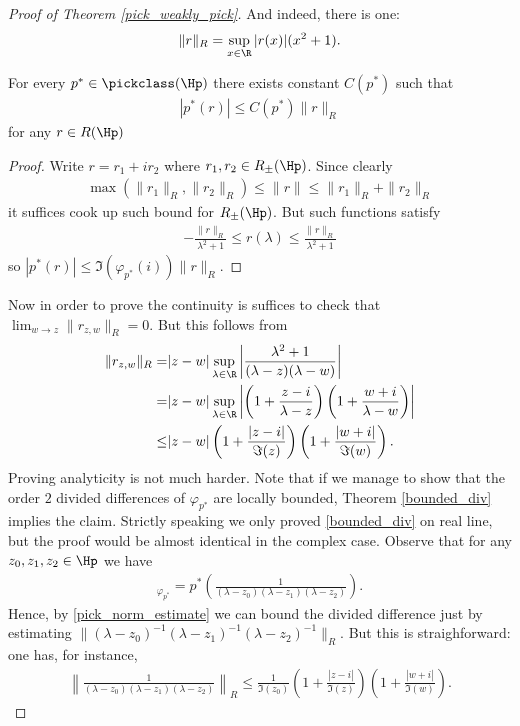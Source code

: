 \begin{proof}[Proof of Theorem \ref{pick_weakly_pick}]
	And indeed, there is one:
	\begin{align*}
		\|r\|_{R} = \sup_{x \in \R} |r(x)| (x^2 + 1).
	\end{align*}
	\begin{lem}\label{pick_norm_estimate}
		For every $p^{*} \in \pickclass(\Hp)$ there exists constant $C(p^{*})$ such that
		\begin{align*}
			\left|p^{*} (r)\right| \leq C(p^{*}) \|r\|_{R}
		\end{align*}
		for any $r \in R(\Hp)$
	\end{lem}
	\begin{proof}
		Write $r = r_{1} + i r_{2}$ where $r_{1}, r_{2} \in R_{\pm}(\Hp)$. Since clearly
		\begin{align*}
			\max(\|r_{1}\|_{R}, \|r_{2}\|_{R}) \leq \|r\| \leq \|r_{1}\|_{R} + \|r_{2}\|_{R}
		\end{align*} it suffices cook up such bound for $R_{\pm}(\Hp)$. But such functions satisfy
		\begin{align*}
			-\frac{\|r\|_{R}}{\lambda^2 + 1} \leq r(\lambda) \leq \frac{\|r\|_{R}}{\lambda^2 + 1} 
		\end{align*}
		so $|p^{*}(r)| \leq \Im(\varphi_{p^{*}}(i)) \|r\|_{R}$.
	\end{proof}
	Now in order to prove the continuity is suffices to check that $\lim_{w \to z} \|r_{z, w}\|_{R} = 0$. But this follows from
	\begin{align*}
		\|r_{z, w}\|_{R} = & |z - w| \sup_{\lambda \in \R}\left|\frac{\lambda^2 + 1}{(\lambda - z) (\lambda - w)}\right| \\
		= & |z - w| \sup_{\lambda \in \R}\left|\left(1 + \frac{z - i}{\lambda - z}\right) \left(1 + \frac{w + i}{\lambda - w}\right)\right| \\
		\leq & |z - w| \left(1 + \frac{|z - i|}{\Im(z)}\right) \left(1 + \frac{|w + i|}{\Im(w)}\right).
	\end{align*}
	Proving analyticity is not much harder. Note that if we manage to show that the order $2$ divided differences of $\varphi_{p^{*}}$ are locally bounded, Theorem \ref{bounded_div} implies the claim. Strictly speaking we only proved \ref{bounded_div} on real line, but the proof would be almost identical in the complex case. Observe that for any $z_{0}, z_{1}, z_{2} \in \Hp$ we have
	\begin{align*}
		[z_{0}, z_{1}, z_{2}]_{\varphi_{p^{*}}} = p^{*}\left(\frac{1}{(\lambda - z_{0}) (\lambda - z_{1}) (\lambda - z_{2})} \right).
	\end{align*}
	Hence, by \ref{pick_norm_estimate} we can bound the divided difference just by estimating $\|(\lambda - z_{0})^{-1} (\lambda - z_{1})^{-1} (\lambda - z_{2})^{-1}\|_{R}$. But this is straighforward: one has, for instance,
	\begin{align*}
		\left\|\frac{1}{(\lambda - z_{0}) (\lambda - z_{1}) (\lambda - z_{2})}\right\|_{R} \leq \frac{1}{\Im(z_{0})} \left(1 + \frac{|z - i|}{\Im(z)}\right) \left(1 + \frac{|w + i|}{\Im(w)}\right).
	\end{align*}
\end{proof}

